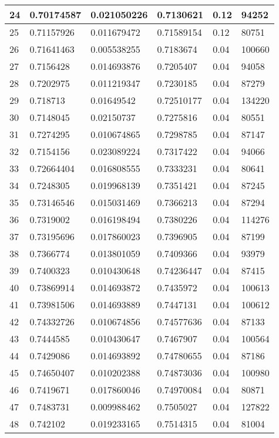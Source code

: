 \begin{longtable}{|l|l|l|l|l|l|}
24 & 0.70174587 & 0.021050226 & 0.7130621 & 0.12 & 94252 \\ \hline 
25 & 0.71157926 & 0.011679472 & 0.71589154 & 0.12 & 80751 \\ \hline 
26 & 0.71641463 & 0.005538255 & 0.7183674 & 0.04 & 100660 \\ \hline 
27 & 0.7156428 & 0.014693876 & 0.7205407 & 0.04 & 94058 \\ \hline 
28 & 0.7202975 & 0.011219347 & 0.7230185 & 0.04 & 87279 \\ \hline 
29 & 0.718713 & 0.01649542 & 0.72510177 & 0.04 & 134220 \\ \hline 
30 & 0.7148045 & 0.02150737 & 0.7275816 & 0.04 & 80551 \\ \hline 
31 & 0.7274295 & 0.010674865 & 0.7298785 & 0.04 & 87147 \\ \hline 
32 & 0.7154156 & 0.023089224 & 0.7317422 & 0.04 & 94066 \\ \hline 
33 & 0.72664404 & 0.016808555 & 0.7333231 & 0.04 & 80641 \\ \hline 
34 & 0.7248305 & 0.019968139 & 0.7351421 & 0.04 & 87245 \\ \hline 
35 & 0.73146546 & 0.015031469 & 0.7366213 & 0.04 & 87294 \\ \hline 
36 & 0.7319002 & 0.016198494 & 0.7380226 & 0.04 & 114276 \\ \hline 
37 & 0.73195696 & 0.017860023 & 0.7396905 & 0.04 & 87199 \\ \hline 
38 & 0.7366774 & 0.013801059 & 0.7409366 & 0.04 & 93979 \\ \hline 
39 & 0.7400323 & 0.010430648 & 0.74236447 & 0.04 & 87415 \\ \hline 
40 & 0.73869914 & 0.014693872 & 0.7435972 & 0.04 & 100613 \\ \hline 
41 & 0.73981506 & 0.014693889 & 0.7447131 & 0.04 & 100612 \\ \hline 
42 & 0.74332726 & 0.010674856 & 0.74577636 & 0.04 & 87133 \\ \hline 
43 & 0.7444585 & 0.010430647 & 0.7467907 & 0.04 & 100564 \\ \hline 
44 & 0.7429086 & 0.014693892 & 0.74780655 & 0.04 & 87186 \\ \hline 
45 & 0.74650407 & 0.010202388 & 0.74873036 & 0.04 & 100980 \\ \hline 
46 & 0.7419671 & 0.017860046 & 0.74970084 & 0.04 & 80871 \\ \hline 
47 & 0.7483731 & 0.009988462 & 0.7505027 & 0.04 & 127822 \\ \hline 
48 & 0.742102 & 0.019233165 & 0.7514315 & 0.04 & 81004 \\ \hline 

\end{longtable}
